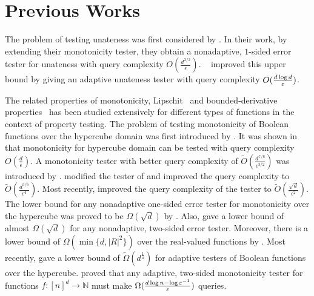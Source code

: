 \section{Previous Works}
The problem of testing unateness was first considered by \citet{GGLRS00}. In their work, by extending their monotonicity tester, they obtain a nonadaptive, $1$-sided error tester for unateness with query complexity $O(\frac{d^{3/2}}{\epsilon})$. ~\citet{KS16} improved this upper bound by giving an adaptive unateness tester with query complexity $O(\frac{d\log d}{\varepsilon})$. 

The related properties of monotonicity, Lipschit~\cite{JR13,CS13,BlaRY14} and bounded-derivative properties~\cite{CDJS17} has been studied extensively for different types of functions in the context of property testing. The problem of testing monotonicity of Boolean functions over the hypercube domain was first introduced by \citet{GGLRS00}. It was shown in \cite{DGLRRS99,GGLRS00} that monotonicity for hypercube domain can be tested with query complexity $O(\frac{d}{\epsilon})$. A monotonicity tester with better query complexity of $\tilde{O}(\frac{d^{7/8}}{\epsilon^{3/2}})$ was introduced by \citet{CS13b}. \citet{CST14} modified the tester of \citet{CS13b} and improved the query complexity to $\tilde{O}(\frac{d^{5/6}}{\epsilon^4})$. Most recently, \citet{KMS15} improved the query complexity of the tester to $\tilde{O}(\frac{\sqrt{d}}{\epsilon^2})$. The lower bound for any nonadaptive one-sided error tester for monotonicity over the hypercube was proved to be $\Omega(\sqrt{d})$ by \citet{FLNRRS02}. Also, \citet{CDST15} gave a lower bound of almost $\Omega(\sqrt{d})$ for any nonadaptive, two-sided error tester. Moreover, there is a lower bound of $\Omega(\min\{d, |R|^2\})$ over the real-valued functions by \citet{BBM12}. Most recently, \citet{BB16} gave a lower bound of $\tilde{\Omega}(d^{\frac{1}{4}})$ for adaptive testers of Boolean functions over the hypercube. \citet{CS13} proved that any adaptive, two-sided monotonicity tester for functions $f:[n]^d\rightarrow \mathbb{N}$ must make $\Omega(\frac{d\log n- \log \varepsilon^{-1}}{\varepsilon})$ queries.

